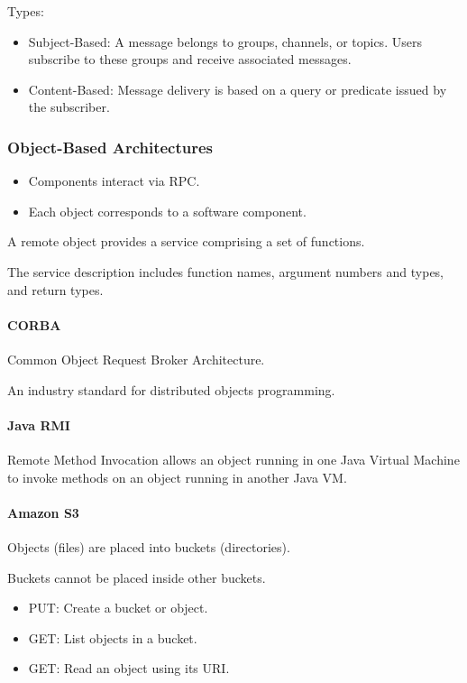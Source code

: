 \documentclass{article}
\begin{document}
Types:

\begin{itemize}
    \item Subject-Based: A message belongs to groups, channels, or topics. Users subscribe to these groups and receive associated messages.
    \item Content-Based: Message delivery is based on a query or predicate issued by the subscriber.
\end{itemize}

\subsubsection{Object-Based Architectures}

\begin{itemize}
    \item Components interact via RPC.
    \item Each object corresponds to a software component.
\end{itemize}

A remote object provides a service comprising a set of functions.

The service description includes function names, argument numbers and types, and return types.

\paragraph{CORBA}

Common Object Request Broker Architecture.

An industry standard for distributed objects programming.

\paragraph{Java RMI}

Remote Method Invocation allows an object running in one Java Virtual Machine to invoke methods on an object running in another Java VM.

\paragraph{Amazon S3}

Objects (files) are placed into buckets (directories).

Buckets cannot be placed inside other buckets.

\begin{itemize}
    \item PUT: Create a bucket or object.
    \item GET: List objects in a bucket.
    \item GET: Read an object using its URI.
\end{itemize}
\end{document}
